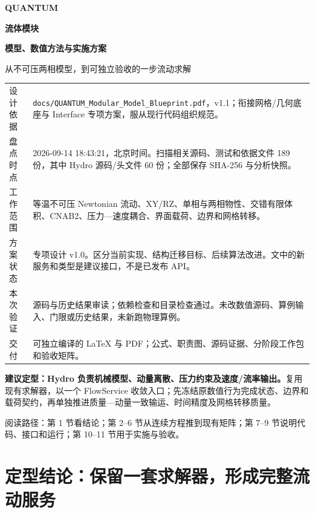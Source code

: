 \documentclass[UTF8,a4paper,11pt,fontset=fandol]{ctexart}
\newcommand{\code}[1]{\nolinkurl{#1}}
\newcommand{\decision}[1]{\par\medskip\noindent\colorbox{pale}{\parbox{\dimexpr\linewidth-2\fboxsep}{\strut #1\strut}}\par\medskip}
\begin{document}
\hypersetup{pageanchor=false}
\begin{titlepage}
\vspace*{12mm}
{\Large\bfseries\color{accent}QUANTUM\par}\vspace{8mm}
{\Huge\bfseries\color{ink}流体模块\par}\vspace{5mm}
{\LARGE\bfseries 模型、数值方法与实施方案\par}\vspace{8mm}
{\large 从不可压两相模型，到可独立验收的一步流动求解\par}\vspace{12mm}
\noindent\begin{tabularx}{\textwidth}{@{}P{.20\textwidth}X@{}}
\toprule
设计依据 & \code{docs/QUANTUM_Modular_Model_Blueprint.pdf}，v1.1；衔接网格/几何底座与 Interface 专项方案，服从现行代码组织规范。\\
盘点时点 & 2026-09-14 18:43:21，北京时间。扫描相关源码、测试和依据文件 189 份，其中 Hydro 源码/头文件 60 份；全部保存 SHA-256 与分析快照。\\
工作范围 & 等温不可压 Newtonian 流动、XY/RZ、单相与两相物性、交错有限体积、CNAB2、压力—速度耦合、界面载荷、边界和网格转移。\\
方案状态 & 专项设计 v1.0。区分当前实现、结构迁移目标、后续算法改进。文中的新服务和类型是建议接口，不是已发布 API。\\
本次验证 & 源码与历史结果审读；依赖检查和目录检查通过。未改数值源码、算例输入、门限或历史结果，未新跑物理算例。\\
交付 & 可独立编译的 LaTeX 与 PDF；公式、职责图、源码证据、分阶段工作包和验收矩阵。\\
\bottomrule
\end{tabularx}\vspace{9mm}
\decision{\textbf{建议定型：Hydro 负责机械模型、动量离散、压力约束及速度/流率输出。}复用现有求解器，以一个 FlowService 收敛入口；先冻结原数值行为完成状态、边界和载荷契约，再单独推进质量—动量一致输运、时间精度及网格转移质量。}
\vfill
{\small\color{muted}阅读路径：第 1 节看结论；第 2--6 节从连续方程推到现有矩阵；第 7--9 节说明代码、接口和运行；第 10--11 节用于实施与验收。}
\end{titlepage}
\hypersetup{pageanchor=true}
{\small\setlength{\parskip}{0pt}\tableofcontents}\clearpage

\section{定型结论：保留一套求解器，形成完整流动服务}
\end{document}
